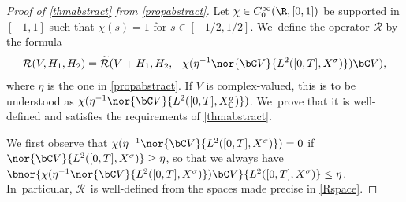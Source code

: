 \begin{proof}[Proof of \cref{thmabstract} from \cref{propabstract}]
Let $\chi\in C^{\infty}_{0}(\R,[0,1])$ be supported in $[-1,1]$ such that $\chi(s)=1$ for $s\in [-1/2,1/2]$. We~define the operator $\mathcal{R}$ by the formula
\begin{align}\label{defR}
\mathcal{R}(V,H_{1},H_{2})=\mathcal{\widetilde{R}}(V+H_{1},H_{2},- \chi(\eta^{-1} \nor{\bC V}{L^{2}([0,T],X^{\sigma})}) \bC V),
\end{align}
where $\eta$ is the one in \cref{propabstract}. If $V$ is complex-valued, this is to be understood as $\chi(\eta^{-1} \nor{\bC V}{L^{2}([0,T],X^{\sigma}_{\mathbb{C}})})$. We~prove that it is well-defined and satisfies the requirements of \cref{thmabstract}.

We first observe that $\chi(\eta^{-1} \nor{\bC V}{L^{2}([0,T],X^{\sigma})}) =0$ if $\nor{ \bC V}{L^{2}([0,T],X^{\sigma})}\geq \eta$, so that we always have $\bnor{ \chi(\eta^{-1} \nor{ \bC V}{L^{2}([0,T],X^{\sigma})}) \bC V}{L^{2}([0,T],X^{\sigma})}\leq \eta$. In~particular, $\mathcal{R}$~is well-defined from the spaces made precise in \eqref{Rspace}.


\end{proof}
